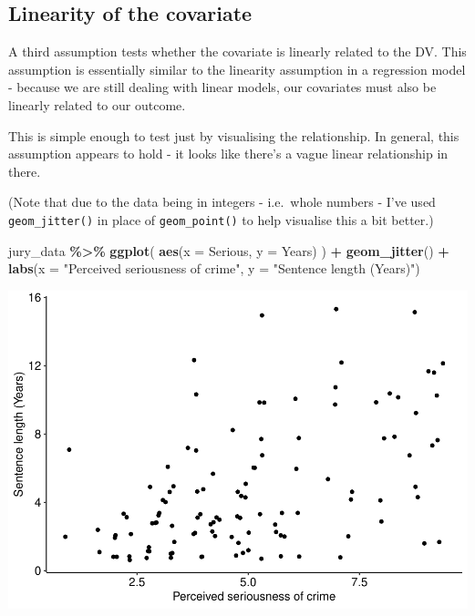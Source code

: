 \documentclass[
]{book}
\newenvironment{Shaded}{\begin{snugshade}}{\end{snugshade}}
\newcommand{\AttributeTok}[1]{\textcolor[rgb]{0.13,0.29,0.53}{#1}}
\newcommand{\FunctionTok}[1]{\textcolor[rgb]{0.13,0.29,0.53}{\textbf{#1}}}
\newcommand{\NormalTok}[1]{#1}
\newcommand{\SpecialCharTok}[1]{\textcolor[rgb]{0.81,0.36,0.00}{\textbf{#1}}}
\newcommand{\StringTok}[1]{\textcolor[rgb]{0.31,0.60,0.02}{#1}}
\begin{document}
\hypertarget{linearity-of-the-covariate}{%
\subsection{Linearity of the covariate}\label{linearity-of-the-covariate}}

A third assumption tests whether the covariate is linearly related to the DV. This assumption is essentially similar to the linearity assumption in a regression model - because we are still dealing with linear models, our covariates must also be linearly related to our outcome.

This is simple enough to test just by visualising the relationship. In general, this assumption appears to hold - it looks like there's a vague linear relationship in there.

(Note that due to the data being in integers - i.e.~whole numbers - I've used \texttt{geom\_jitter()} in place of \texttt{geom\_point()} to help visualise this a bit better.)

\begin{Shaded}
\begin{Highlighting}[]
\NormalTok{jury\_data }\SpecialCharTok{\%\textgreater{}\%}
  \FunctionTok{ggplot}\NormalTok{(}
    \FunctionTok{aes}\NormalTok{(}\AttributeTok{x =}\NormalTok{ Serious, }\AttributeTok{y =}\NormalTok{ Years)}
\NormalTok{  ) }\SpecialCharTok{+} 
  \FunctionTok{geom\_jitter}\NormalTok{() }\SpecialCharTok{+} 
  \FunctionTok{labs}\NormalTok{(}\AttributeTok{x =} \StringTok{"Perceived seriousness of crime"}\NormalTok{, }\AttributeTok{y =} \StringTok{"Sentence length (Years)"}\NormalTok{)}
\end{Highlighting}
\end{Shaded}

\begin{center}\includegraphics{_main_files/figure-latex/unnamed-chunk-266-1} \end{center}
\end{document}
